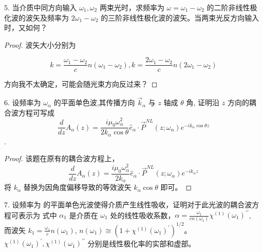 \begin{exercise}

5. 当介质中同方向输入 $\omega_1,\omega_2$ 两束光时，求频率为 $\omega = \omega_1-\omega_2$ 的二阶非线性极化波的波矢及频率为 $2\omega_1-\omega_2$ 的三阶非线性极化波的波矢。当两束光反方向输入时，又如何？
\end{exercise}

\begin{proof}
波矢大小分别为 

$$k=\frac{\omega_1-\omega_2}{c}n(\omega_1-\omega_2), k=\frac{2\omega_1-\omega_2}{c}n(2\omega_1-\omega_2)$$

方向我不太确定，可能会随光束方向反过来？
\end{proof}


\begin{exercise}
6.  设频率为 $\omega_\alpha$ 的平面单色波,其传播方向 $\vec{k}_{\alpha}$ 与 $z$ 轴成 $\theta$ 角, 证明沿 $z$ 方向的耦合波方程可写成  $$\frac{d}{d z} A_{\alpha}(z)=\frac{i \mu_{0} \omega_{\alpha}^{2}}{2 k_{\alpha} \cos \theta} \hat{e}_{\alpha} \cdot \vec{P}^{N L}\left(z ; \omega_{\alpha}\right) e^{-i k_{\alpha} \cos \theta z}$$.
\end{exercise}

\begin{proof}
    该题在原有的耦合波方程上，
    $$\frac{d}{d z} A_{\alpha}(z)=\frac{i \mu_{0} \omega_{\alpha}^{2}}{2 k_{\alpha} } \hat{e}_{\alpha} \cdot \vec{P}^{N L}\left(z ; \omega_{\alpha}\right) e^{-i k_{\alpha} z}$$
    将 $k_{\alpha}$ 替换为因角度偏移导致的等效波矢 $k_{\alpha} \cos \theta$ 即可。
\end{proof}

\begin{exercise}

7.  设频率为 的平面单色光波使得介质产生线性吸收，证明对于此光波的耦合波方程可表示为      
式中 $\alpha_1$ 是介质在 $\omega_1$ 处的线性吸收系数，$\alpha=\frac{\omega_{1}}{c n\left(\omega_{1}\right)} \chi^{(1)}\left(\omega_{1}\right)^{\prime \prime}$,\\
而波矢 $k_{1}=\frac{\omega_{1}}{c} n\left(\omega_{1}\right)$, $n\left(\omega_{1}\right) \cong\left(1+\chi^{(1)}\left(\omega_{1}\right)^{\prime}\right)^{1 / 2}$。\\
$\chi^{(1)}\left(\omega_{1}\right)^{\prime}, \chi^{(1)}\left(\omega_{1}\right)^{\prime \prime}$ 分别是线性极化率的实部和虚部。
\end{exercise}

